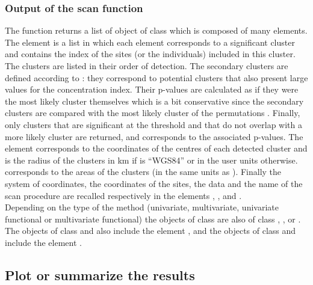 \subsubsection{Output of the scan function}
The function  returns a list of object of class  which is composed of many elements.
The element  is a list in which each element corresponds to a significant cluster and contains the index of the sites (or the individuals) included in this cluster. The clusters are listed in their order of detection. The secondary clusters are defined according to \citet{spatialscanstat}:
they correspond to potential clusters that also present large values for the concentration index. Their p-values are calculated as if they were the most likely cluster themselves which is a bit conservative since the secondary clusters are compared with the most likely cluster of the permutations \citep{spatialscanstat}. Finally, only clusters that are significant at the  threshold and that do not overlap with a more likely cluster are returned, and  corresponds to the associated p-values. 
The element  corresponds to the coordinates of the centres of each detected cluster and  is the radius of the clusters in km if  is ``WGS84'' or in the user units otherwise.  corresponds to the areas of the clusters (in the same units as ).
Finally the system of coordinates, the coordinates of the sites, the data and the name of the scan procedure are recalled respectively in the elements , ,  and . \\


\noindent Depending on the type of the method (univariate, multivariate, univariate functional or multivariate functional) the objects of class  are also of class , ,  or .
The objects of class  and  also include the  element , and the objects of class  and   include the  element .



\subsection{Plot or summarize the results}

